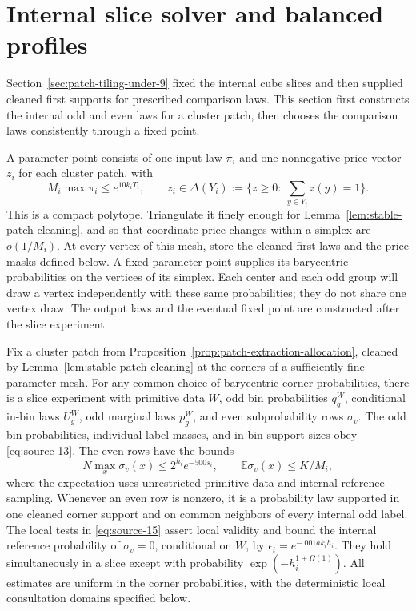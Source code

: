 \section{Internal slice solver and balanced profiles}
\label{sec:internal-solver-and-profiles-for-these-tilings}

Section~\ref{sec:patch-tiling-under-9} fixed the internal cube slices and
then supplied cleaned first supports for prescribed comparison laws. This section first
constructs the internal odd and even laws for a cluster patch, then chooses
the comparison laws consistently through a fixed point.

A parameter point consists of one input law \(\pi_i\) and one nonnegative price vector \(z_i\) for each cluster patch, with
\[
 M_i\max\pi_i\le e^{10k_iT_i},\qquad
 z_i\in\Delta(Y_i):=\{z\ge0:\ \sum_{y\in Y_i}z(y)=1\}.
\]
This is a compact polytope. Triangulate it finely enough for Lemma~\ref{lem:stable-patch-cleaning}, and so that coordinate price changes within a simplex are \(o(1/M_i)\). At every vertex of this mesh, store the cleaned first laws and the price masks defined below. A fixed parameter point supplies its barycentric probabilities on the vertices of its simplex. Each center and each odd group will draw a vertex independently with these same probabilities; they do not share one vertex draw. The output laws and the eventual fixed point are constructed after the slice experiment.

\begin{proposition}\label{prop:internal-slice-solver}
Fix a cluster patch from Proposition~\ref{prop:patch-extraction-allocation}, cleaned by Lemma~\ref{lem:stable-patch-cleaning} at the corners of a sufficiently fine parameter mesh. For any common choice of barycentric corner probabilities, there is a slice experiment with primitive data \(W\), odd bin probabilities \(q_g^W\), conditional in-bin laws \(U_g^W\), odd marginal laws \(p_g^W\), and even subprobability rows \(\sigma_v\). The odd bin probabilities, individual label masses, and in-bin support sizes obey \eqref{eq:source-13}. The even rows have the bounds
\[
 N\max_x\sigma_v(x)\le 2^{h_i}e^{-500s_i},\qquad
 \mathbb E\sigma_v(x)\le K/M_i,
\]
where the expectation uses unrestricted primitive data and internal reference sampling. Whenever an even row is nonzero, it is a probability law supported in one cleaned corner support and on common neighbors of every internal odd label. The local tests in \eqref{eq:source-15} assert local validity and bound the internal reference probability of \(\sigma_v=0\), conditional on \(W\), by \(\epsilon_i=e^{-.001a k_i h_i}\). They hold simultaneously in a slice except with probability \(\exp(-h_i^{1+\Omega(1)})\). All estimates are uniform in the corner probabilities, with the deterministic local consultation domains specified below.
\end{proposition}

